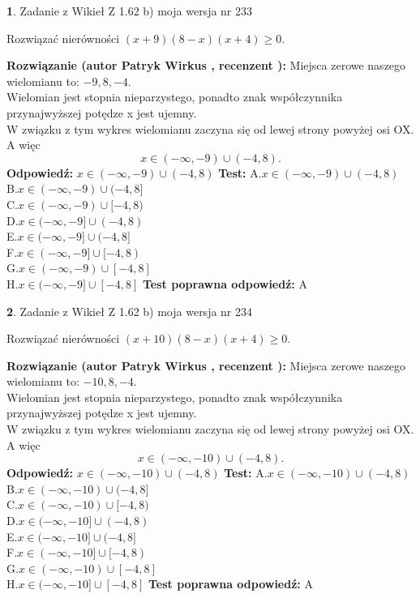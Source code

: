 \documentclass[12pt, a4paper]{article}
\theoremstyle{definition} %
\newtheorem{zad}{}
\newcommand{\zadStart}[1]{\begin{zad}#1\newline}
\newcommand{\zadStop}{\end{zad}}
\newcommand{\rozwStart}[2]{\noindent \textbf{Rozwiązanie (autor #1 , recenzent #2): }\newline}
\newcommand{\rozwStop}{\newline}
\newcommand{\odpStart}{\noindent \textbf{Odpowiedź:}\newline}
\newcommand{\odpStop}{\newline}
\newcommand{\testStart}{\noindent \textbf{Test:}\newline}
\newcommand{\testStop}{\newline}
\newcommand{\kluczStart}{\noindent \textbf{Test poprawna odpowiedź:}\newline}
\newcommand{\kluczStop}{\newline}
\begin{document}
\zadStart{Zadanie z Wikieł Z 1.62 b) moja wersja nr 233}

Rozwiązać nierówności $(x+9)(8-x)(x+4)\ge0$.
\zadStop
\rozwStart{Patryk Wirkus}{}
Miejsca zerowe naszego wielomianu to: $-9, 8, -4$.\\
Wielomian jest stopnia nieparzystego, ponadto znak współczynnika przy\linebreak najwyższej potędze x jest ujemny.\\ W związku z tym wykres wielomianu zaczyna się od lewej strony powyżej osi OX. A więc $$x \in (-\infty,-9) \cup (-4,8).$$
\rozwStop
\odpStart
$x \in (-\infty,-9) \cup (-4,8)$
\odpStop
\testStart
A.$x \in (-\infty,-9) \cup (-4,8)$\\
B.$x \in (-\infty,-9) \cup (-4,8]$\\
C.$x \in (-\infty,-9) \cup [-4,8)$\\
D.$x \in (-\infty,-9] \cup (-4,8)$\\
E.$x \in (-\infty,-9] \cup (-4,8]$\\
F.$x \in (-\infty,-9] \cup [-4,8)$\\
G.$x \in (-\infty,-9) \cup [-4,8]$\\
H.$x \in (-\infty,-9] \cup [-4,8]$
\testStop
\kluczStart
A
\kluczStop



\zadStart{Zadanie z Wikieł Z 1.62 b) moja wersja nr 234}

Rozwiązać nierówności $(x+10)(8-x)(x+4)\ge0$.
\zadStop
\rozwStart{Patryk Wirkus}{}
Miejsca zerowe naszego wielomianu to: $-10, 8, -4$.\\
Wielomian jest stopnia nieparzystego, ponadto znak współczynnika przy\linebreak najwyższej potędze x jest ujemny.\\ W związku z tym wykres wielomianu zaczyna się od lewej strony powyżej osi OX. A więc $$x \in (-\infty,-10) \cup (-4,8).$$
\rozwStop
\odpStart
$x \in (-\infty,-10) \cup (-4,8)$
\odpStop
\testStart
A.$x \in (-\infty,-10) \cup (-4,8)$\\
B.$x \in (-\infty,-10) \cup (-4,8]$\\
C.$x \in (-\infty,-10) \cup [-4,8)$\\
D.$x \in (-\infty,-10] \cup (-4,8)$\\
E.$x \in (-\infty,-10] \cup (-4,8]$\\
F.$x \in (-\infty,-10] \cup [-4,8)$\\
G.$x \in (-\infty,-10) \cup [-4,8]$\\
H.$x \in (-\infty,-10] \cup [-4,8]$
\testStop
\kluczStart
A
\kluczStop
\end{document}
